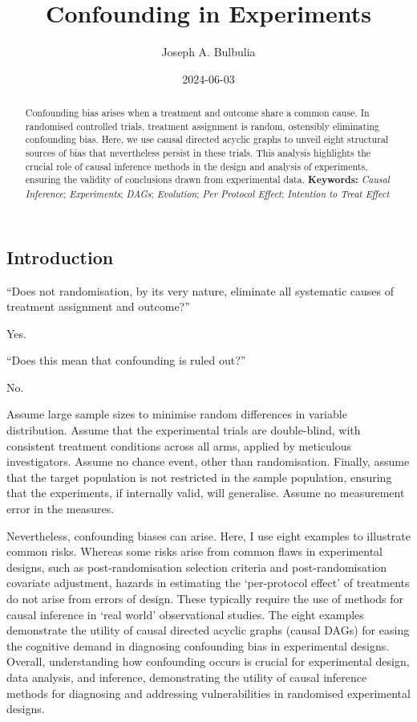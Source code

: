 \documentclass[
  single column]{article}
\title{Confounding in Experiments}
\author{Joseph A. Bulbulia}
\affil{%
             \small{     Victoria University of Wellington, New Zealand
          ORCID \textcolor[HTML]{A6CE39}{\aiOrcid} ~0000-0002-5861-2056 }
              }
\date{2024-06-03}
\begin{document}
\maketitle
\begin{abstract}
Confounding bias arises when a treatment and outcome share a common
cause. In randomised controlled trials, treatment assignment is random,
ostensibly eliminating confounding bias. Here, we use causal directed
acyclic graphs to unveil eight structural sources of bias that
nevertheless persist in these trials. This analysis highlights the
crucial role of causal inference methods in the design and analysis of
experiments, ensuring the validity of conclusions drawn from
experimental data. \textbf{Keywords:} \emph{Causal Inference};
\emph{Experiments}; \emph{DAGs}; \emph{Evolution}; \emph{Per Protocol
Effect}; \emph{Intention to Treat Effect}
\end{abstract}

\subsection{Introduction}\label{introduction}

``Does not randomisation, by its very nature, eliminate all systematic
causes of treatment assignment and outcome?''

Yes.

``Does this mean that confounding is ruled out?''

No.

Assume large sample sizes to minimise random differences in variable
distribution. Assume that the experimental trials are double-blind, with
consistent treatment conditions across all arms, applied by meticulous
investigators. Assume no chance event, other than randomisation.
Finally, assume that the target population is not restricted in the
sample population, ensuring that the experiments, if internally valid,
will generalise. Assume no measurement error in the measures.

Nevertheless, confounding biases can arise. Here, I use eight examples
to illustrate common risks. Whereas some risks arise from common flaws
in experimental designs, such as post-randomisation selection criteria
and post-randomisation covariate adjustment, hazards in estimating the
`per-protocol effect' of treatments do not arise from errors of design.
These typically require the use of methods for causal inference in `real
world' observational studies. The eight examples demonstrate the utility
of causal directed acyclic graphs (causal DAGs) for easing the cognitive
demand in diagnosing confounding bias in experimental designs. Overall,
understanding how confounding occurs is crucial for experimental design,
data analysis, and inference, demonstrating the utility of causal
inference methods for diagnosing and addressing vulnerabilities in
randomised experimental designs.
\end{document}
